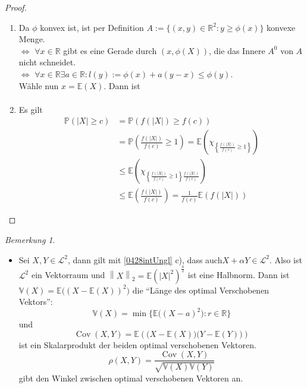 \documentclass[10pt,a4paper]{article}
\newcommand{\R}{\ensuremath{\mathbb{R}}}
\newcommand{\al}{\ensuremath{\alpha}}
\newcommand{\norm}[1]{\left\|#1\right\|}
\newcommand{\Prb}{\mathbb P}
\newcommand{\Epv}{\ensuremath{\mathbb{E}}}
\newcommand{\Var}{\mathbb{V}}
\newcommand{\Cov}{\operatorname{Cov}}
\newcommand{\Kor}{\rho}
\newcommand{\scL}{\mathscr L}
\theoremstyle{plain}
\theoremstyle{definition}
\theoremstyle{remark}
\newtheorem{bem}[theorem]{Bemerkung}
\begin{document}
	\begin{proof}
		\begin{enumerate}
			\item Da $\phi$ konvex ist, ist per Definition $A:=\{(x,y)\in\R^2:y\geq\phi(x)\}$ konvexe Menge.\\
			$\Leftrightarrow$ $\forall x\in\R$ gibt es eine Gerade durch $(x,\phi(X))$, die das Innere $A^0$ von $A$ nicht schneidet.\\
			$\Leftrightarrow $ $\forall x\in\R\exists a\in\R:l(y):=\phi(x)+a(y-x)\leq \phi(y)$.\\
			Wähle nun $x=\Epv(X)$. Dann ist 
			\begin{align*}
			\end{align*}
			\setcounter{enumi}{3}
			\item Es gilt
			\begin{align*}
			\Prb(|X|\ge c)&=\Prb(f(|X|)\geq f(c))\\
			&=\Prb\left(\frac{f(|X|)}{f(c)}\geq 1\right)=\Epv\left(\chi_{\left\{\frac{f(|X|)}{f(c)}\geq 1\right\}}\right)\\
			&\leq\Epv\left(\chi_{\left\{\frac{f(|X|)}{f(c)}\geq 1\right\}\frac{f(|X|)}{f(c)}}\right)\\
			&\leq\Epv\left(\frac{f(|X|)}{f(c)}\right)=\frac{1}{f(c)}\Epv(f(|X|))
			\end{align*}
		\end{enumerate}
	\end{proof}

	\begin{bem}
		\begin{itemize}
			\item Sei $X,Y\in\scL^2$, dann gilt mit \ref{0428intUngl} c), dass auch$X+\al Y\in\scL^2$. Also ist $\scL^2$ ein Vektorraum und $\norm{X}_2=\Epv(|X|^2)^\frac{a}{2}$ ist eine Halbnorm.
			Dann ist $\Var(X)=\Epv\big((X-\Epv(X))^2\big)$ die \enquote{Länge des optimal Verschobenen Vektors}:
			\[\Var(X)=\min\{\Epv\big((X-a)^2\big):r\in\R\}\]
			und
			\[\Cov(X,Y)=\Epv\left(\big(X-\Epv(X)\big)\big(Y-\Epv(Y)\big)\right)\]
			ist ein Skalarprodukt der beiden optimal verschobenen Vektoren.
			\[\Kor(X,Y)=\frac{\Cov(X,Y)}{\sqrt{\Var(X)\Var(Y)}}\]
			gibt den Winkel zwischen optimal verschobenen Vektoren an.
		\end{itemize}
	\end{bem}
\end{document}
